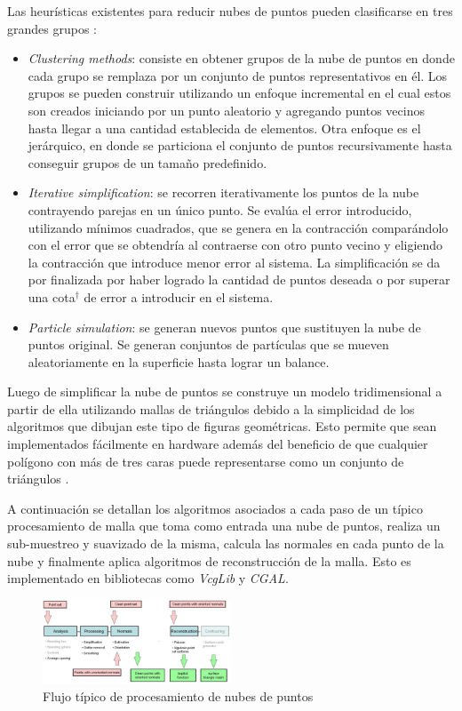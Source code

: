 Las heurísticas existentes para reducir nubes de puntos pueden clasificarse en tres grandes grupos \cite{PntCloud}:
\begin{itemize}
   \item \emph{Clustering methods}: consiste en obtener grupos de la nube de puntos en donde cada grupo se remplaza por un conjunto de puntos representativos en él. Los grupos se pueden construir utilizando un enfoque incremental en el cual estos son creados iniciando por un punto aleatorio y agregando puntos vecinos hasta llegar a una cantidad establecida de elementos. Otra enfoque es el jerárquico, en donde se particiona el conjunto de puntos recursivamente hasta conseguir grupos de un tamaño predefinido.
   \item \emph{Iterative simplification}: se recorren iterativamente los puntos de la nube contrayendo parejas en un único punto. Se evalúa el error introducido, utilizando mínimos cuadrados, que se genera en la contracción comparándolo con el error que se obtendría al contraerse con otro punto vecino y eligiendo la contracción que introduce menor error al sistema. La simplificación se da por finalizada por haber logrado la cantidad de puntos deseada o por superar una cota$^\dagger$ de error a introducir en el sistema.
   \item \emph{Particle simulation}: se generan nuevos puntos que sustituyen la nube de puntos original. Se generan conjuntos de partículas que se mueven aleatoriamente en la superficie hasta lograr un balance.
\end{itemize}

Luego de simplificar la nube de puntos se construye un modelo tridimensional a partir de ella utilizando mallas de triángulos debido a la simplicidad de los algoritmos que dibujan este tipo de figuras geométricas. Esto permite que sean implementados fácilmente en hardware además del beneficio de que cualquier polígono con más de tres caras puede representarse como un conjunto de triángulos \cite{PCloudTriangle}.

A continuación se detallan los algoritmos asociados a cada paso de un típico procesamiento de malla que toma como entrada una nube de puntos, realiza un sub-muestreo y suavizado de la misma, calcula las normales en cada punto de la nube y finalmente aplica algoritmos de reconstrucción de la malla. Esto es implementado en bibliotecas como \emph{VcgLib}\cite{VCGLib} y \emph{CGAL}\cite{CGAL}.

\begin{figure}[H]
  \centering
    \includegraphics[width=0.5\textwidth]{./Cap2_videomapping/malla-flow.png}
  \caption{Flujo típico de procesamiento de nubes de puntos \cite{CGAL}}
  \label{fig:Mesh-CGAL}
\end{figure}

